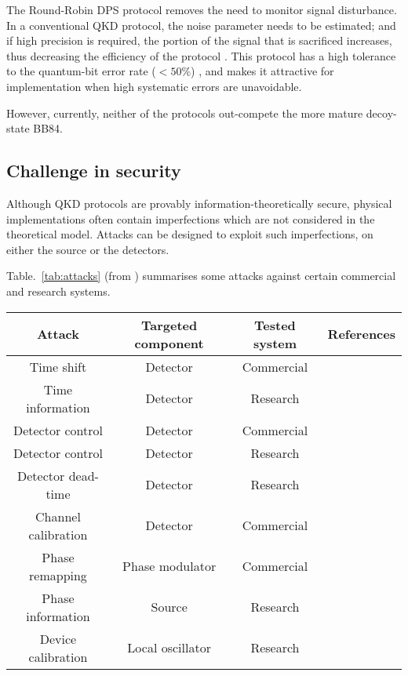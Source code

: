 The Round-Robin DPS protocol \cite{bib:sasaki2014practical} removes the need to monitor signal disturbance. In a conventional QKD protocol, the noise parameter needs to be estimated; and if high precision is required, the portion of the signal that is sacrificed increases, thus decreasing the efficiency of the protocol \cite{bib:cai2009finite, bib:hayashi2014security}. This protocol has a high tolerance to the quantum-bit error rate ($< 50\%$) \cite{bib:xu2015discrete}, and makes it attractive for implementation when high systematic errors are unavoidable.   

However, currently, neither of the protocols out-compete the more mature decoy-state BB84.

\subsection{Challenge in security}

Although QKD protocols are provably information-theoretically secure, physical implementations often contain imperfections which are not considered in the theoretical model. Attacks can be designed to exploit such imperfections, on either the source or the detectors.

Table.~\ref{tab:attacks} (from \cite{bib:lo2014secure}) summarises some attacks against certain commercial and research systems.

\startnormtable
\begin{table*}[!htbp]
\begin{tabular}{|c|c|c|c|} 
 \hline
 Attack &  Targeted component & Tested system & References\\ 
  \hline
  \hline
Time shift
        & Detector & Commercial & \cite{bib:qi2005time, bib:PhysRevA.78.042333, bib:PhysRevA.74.022313}\\
Time information & Detector & Research & \cite{bib:lamas2007breaking} \\
Detector control & Detector  &   Commercial & \cite{bib:lydersen2010hacking, bib:yuan2010avoiding}\\
Detector control  & Detector  & Research & \cite{bib:gerhardt2011full} \\
Detector dead-time      & Detector  & Research   & \cite{bib:weier2011quantum}      \\
Channel calibration    & Detector  &  Commercial  & \cite{bib:jain2011device}      \\
Phase remapping  &  Phase modulator & Commercial & \cite{bib:xu2010experimental} \\
Phase information & Source & Research & \cite{bib:tang2013source}          \\
Device calibration  & Local oscillator & Research & \cite{bib:jouguet2013preventing} \\
                \hline
\end{tabular}
\caption{\label{tab:attacks} Summary of various attacks against some commercial and 
research QKD systems}
\end{table*}
\startalgtable

